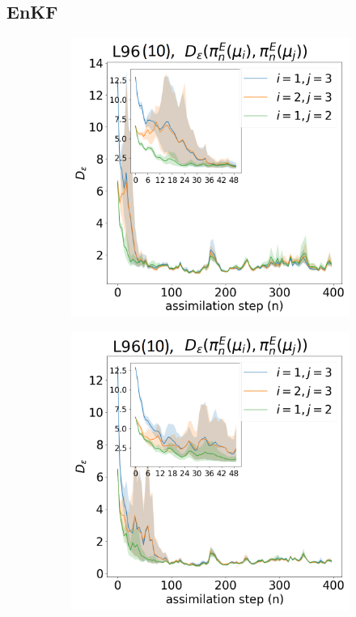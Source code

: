 \subsection{EnKF}
\begin{figure}[!t]
\centering
\begin{subfigure}{.3\textwidth}
\includegraphics[width=\columnwidth]{stability/plots/figures-EnKF-stable_50_L96_10dim.png}%
\end{subfigure}\hspace{0mm}%
\begin{subfigure}{.3\textwidth}
\includegraphics[width=\columnwidth]{stability/plots/figures-EnKF-stable_200_L96_10dim.png}%

\end{subfigure}
\end{figure}
